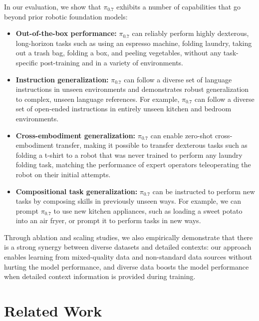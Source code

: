 \documentclass[conference]{IEEEtran}
\def \MethodName {$\pi_{0.7}$}
\begin{document}
In our evaluation, we show that \MethodName{} exhibits a number of capabilities that go beyond prior robotic foundation models:
\begin{itemize}[leftmargin=10pt]
    \item \textbf{Out-of-the-box performance:} \MethodName{} can reliably perform highly dexterous, long-horizon tasks such as using an espresso machine, folding laundry, taking out a trash bag, folding a box, and peeling vegetables, without any task-specific post-training and in a variety of environments.
    \item \textbf{Instruction generalization:} \MethodName{} can follow a diverse set of language instructions in unseen environments and demonstrates robust generalization to complex, unseen language references. For example, \MethodName{} can follow a diverse set of open-ended instructions in entirely unseen kitchen and bedroom environments.
    \item \textbf{Cross-embodiment generalization:} \MethodName{} can enable zero-shot cross-embodiment transfer, making it possible to transfer dexterous tasks such as folding a t-shirt to a robot that was never trained to perform any laundry folding task, matching the performance of expert operators teleoperating the robot on their initial attempts.
    \item \textbf{Compositional task generalization:} \MethodName{} can be instructed to perform new tasks by composing skills in previously unseen ways. For example, we can prompt \MethodName{} to use new kitchen appliances, such as loading a sweet potato into an air fryer, or prompt it to perform tasks in new ways.
\end{itemize}
\noindent Through ablation and scaling studies, we also empirically demonstrate that there is a strong synergy between diverse datasets and detailed contexts: our approach enables learning from mixed-quality data and non-standard data sources without hurting the model performance, and diverse data boosts the model performance when detailed context information is provided during training. 

\section{Related Work}
\label{sec:related_work}
\end{document}
